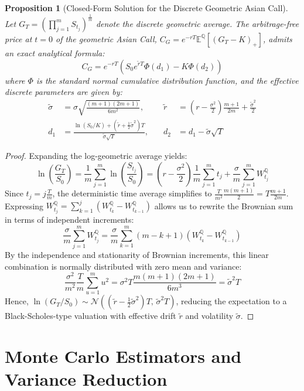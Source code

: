 \documentclass[11pt,a4paper]{article}
\newtheorem{proposition}{Proposition}
\newcommand{\E}{\mathbb{E}}
\newcommand{\Q}{\mathbb{Q}}
\begin{document}
\begin{proposition}[Closed-Form Solution for the Discrete Geometric Asian Call]
Let $G_T = \left( \prod_{j=1}^m S_{t_j} \right)^{\frac{1}{m}}$ denote the discrete geometric average. The arbitrage-free price at $t=0$ of the geometric Asian Call, $C_G = e^{-rT} \E^\Q[(G_T - K)_+]$, admits an exact analytical formula:
\begin{equation}
    C_G = e^{-rT} \left( S_0 e^{\widetilde{r} T} \Phi(d_1) - K \Phi(d_2) \right)
\end{equation}
where $\Phi$ is the standard normal cumulative distribution function, and the effective discrete parameters are given by:
\begin{align*}
    \widetilde{\sigma} &= \sigma \sqrt{\frac{(m+1)(2m+1)}{6m^2}}, \quad & \widetilde{r} &= \left(r - \frac{\sigma^2}{2}\right)\frac{m+1}{2m} + \frac{\widetilde{\sigma}^2}{2} \\
    d_1 &= \frac{\ln(S_0/K) + (\widetilde{r} + \frac{1}{2}\widetilde{\sigma}^2)T}{\widetilde{\sigma}\sqrt{T}}, \quad & d_2 &= d_1 - \widetilde{\sigma}\sqrt{T}
\end{align*}
\end{proposition}

\begin{proof}
Expanding the log-geometric average yields:
\[
\ln\left(\frac{G_T}{S_0}\right) = \frac{1}{m} \sum_{j=1}^m \ln\left(\frac{S_{t_j}}{S_0}\right) = \left(r - \frac{\sigma^2}{2}\right) \frac{1}{m}\sum_{j=1}^m t_j + \frac{\sigma}{m} \sum_{j=1}^m W_{t_j}^\Q
\]
Since $t_j = j \frac{T}{m}$, the deterministic time average simplifies to $\frac{T}{m^2} \frac{m(m+1)}{2} = T \frac{m+1}{2m}$. Expressing $W_{t_j}^\Q = \sum_{k=1}^j (W_{t_k}^\Q - W_{t_{k-1}}^\Q)$ allows us to rewrite the Brownian sum in terms of independent increments:
\[
\frac{\sigma}{m} \sum_{j=1}^m W_{t_j}^\Q = \frac{\sigma}{m} \sum_{k=1}^m (m - k + 1) (W_{t_k}^\Q - W_{t_{k-1}}^\Q)
\]
By the independence and stationarity of Brownian increments, this linear combination is normally distributed with zero mean and variance:
\[
\frac{\sigma^2}{m^2} \frac{T}{m} \sum_{u=1}^m u^2 = \sigma^2 T \frac{m(m+1)(2m+1)}{6m^3} = \widetilde{\sigma}^2 T
\]
Hence, $\ln(G_T/S_0) \sim \mathcal{N}\left( (\widetilde{r} - \frac{1}{2}\widetilde{\sigma}^2)T, \, \widetilde{\sigma}^2 T \right)$, reducing the expectation to a Black-Scholes-type valuation with effective drift $\widetilde{r}$ and volatility $\widetilde{\sigma}$.
\end{proof}

\section{Monte Carlo Estimators and Variance Reduction}
\end{document}
